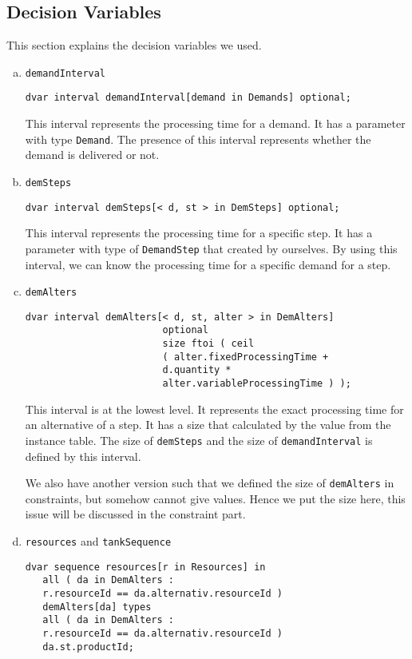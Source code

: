 \documentclass[a4paper, 12pt]{article}
\newcommand{\twoline}{\vspace{2ex}}
\begin{document}
\subsection{Decision Variables}
\twoline 

This section explains the decision variables we used. 
\begin{enumerate}[a.~]
\item \texttt{demandInterval}
\begin{lstlisting}
dvar interval demandInterval[demand in Demands] optional;
\end{lstlisting}
This interval represents the processing time for a demand. It has a parameter with type \texttt{Demand}. The presence of this interval represents whether the demand is delivered or not. 
\item \texttt{demSteps}
\begin{lstlisting}
dvar interval demSteps[< d, st > in DemSteps] optional;
\end{lstlisting}
This interval represents the processing time for a specific step. It has a parameter with type of \texttt{DemandStep} that created by ourselves. By using this interval, we can know the processing time for a specific demand for a step. 
\item \texttt{demAlters}
\begin{lstlisting}
dvar interval demAlters[< d, st, alter > in DemAlters] 
                        optional 
                        size ftoi ( ceil 
                        ( alter.fixedProcessingTime + 
                        d.quantity * 
                        alter.variableProcessingTime ) );
\end{lstlisting}
This interval is at the lowest level. It represents the exact processing time for an alternative of a step. It has a size that calculated by the value from the instance table. The size of \texttt{demSteps} and the size of \texttt{demandInterval} is defined by this interval. 

We also have another version such that we defined the size of \texttt{demAlters} in constraints, but somehow cannot give values. Hence we put the size here, this issue will be discussed in the constraint part. 
\item \texttt{resources} and \texttt{tankSequence}
\begin{lstlisting}
dvar sequence resources[r in Resources] in 
   all ( da in DemAlters :
   r.resourceId == da.alternativ.resourceId ) 
   demAlters[da] types 
   all ( da in DemAlters : 
   r.resourceId == da.alternativ.resourceId ) 
   da.st.productId;
  

\end{lstlisting}
\end{enumerate}
\end{document}
